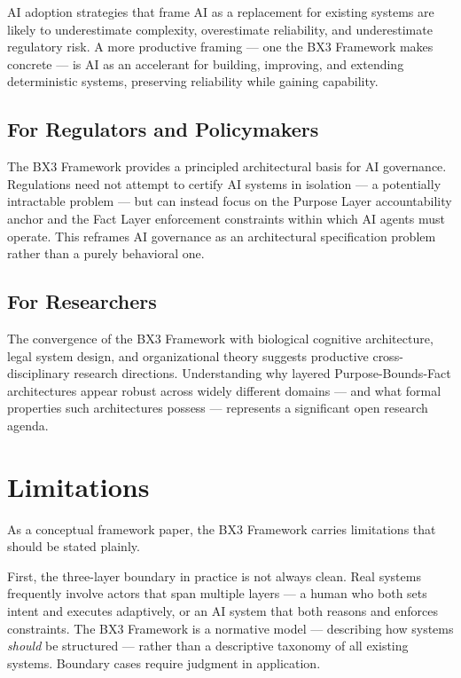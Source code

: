 \documentclass[12pt]{article}
\begin{document}
AI adoption strategies that frame AI as a replacement for existing systems are likely to underestimate complexity, overestimate reliability, and underestimate regulatory risk. A more productive framing --- one the BX3 Framework makes concrete --- is AI as an accelerant for building, improving, and extending deterministic systems, preserving reliability while gaining capability.

\subsection{For Regulators and Policymakers}

The BX3 Framework provides a principled architectural basis for AI governance. Regulations need not attempt to certify AI systems in isolation --- a potentially intractable problem --- but can instead focus on the Purpose Layer accountability anchor and the Fact Layer enforcement constraints within which AI agents must operate. This reframes AI governance as an architectural specification problem rather than a purely behavioral one.

\subsection{For Researchers}

The convergence of the BX3 Framework with biological cognitive architecture, legal system design, and organizational theory suggests productive cross-disciplinary research directions. Understanding why layered Purpose-Bounds-Fact architectures appear robust across widely different domains --- and what formal properties such architectures possess --- represents a significant open research agenda.

\section{Limitations}
\label{sec:limitations}

As a conceptual framework paper, the BX3 Framework carries limitations that should be stated plainly.

First, the three-layer boundary in practice is not always clean. Real systems frequently involve actors that span multiple layers --- a human who both sets intent and executes adaptively, or an AI system that both reasons and enforces constraints. The BX3 Framework is a normative model --- describing how systems \textit{should} be structured --- rather than a descriptive taxonomy of all existing systems. Boundary cases require judgment in application.
\end{document}
